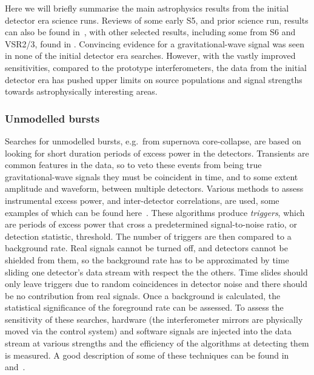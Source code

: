 Here we will briefly summarise the main astrophysics results from the initial detector era science runs.
Reviews of some early S5, and prior science run, results can also be found in~\cite{Papa:2008,
Fairhurst:2009}, with other selected results, including some from S6 and VSR2/3, found in 
\cite{2014GReGr..46.1763B}. Convincing evidence for a gravitational-wave signal was seen in none of the 
initial detector era searches. However, with the vastly improved sensitivities, compared to the prototype 
interferometers, the data from the initial detector era has pushed upper limits on source populations 
and signal strengths towards astrophysically interesting areas.

\subsubsection{Unmodelled bursts}
\label{subsubsection:unmodelled} 

Searches for unmodelled bursts, e.g.\ from supernova core-collapse, are based on looking for short duration 
periods of excess power in the detectors. Transients are common features in the data, so to veto these events 
from being true gravitational-wave signals they must be coincident in time, and to some extent amplitude and
waveform, between multiple detectors. Various methods to assess instrumental excess power, and inter-detector 
correlations, are used, some examples of which can be found here~\cite{Klimenko:2004, Anderson:2001, 
Searle:2008, McNabb:2004, Cadonati:2004, Chatterji:2004, Chatterji:2006, 2008CQGra..25k4029K, 
2010NJPh...12e3034S}. These algorithms produce \textit{triggers}, which are periods of excess power that 
cross a predetermined signal-to-noise ratio, or detection statistic, threshold. The number of triggers are 
then compared to a background rate. Real signals cannot be turned off, and detectors cannot be shielded from 
them, so the background rate has to be approximated by time sliding one detector's data stream with respect 
the the others. Time slides should only leave triggers due to random coincidences in detector noise and there 
should be no contribution from real signals. Once a background is calculated, the statistical significance of the 
foreground rate can be assessed. To assess the sensitivity of these searches, hardware (the interferometer 
mirrors are physically moved via the control system) and software signals are injected into the data stream at
various strengths and the efficiency of the algorithms at detecting them is measured. A good description of 
some of these techniques can be found in \cite{Abbott:2004b} and~\cite{Abbott:2006a}.

